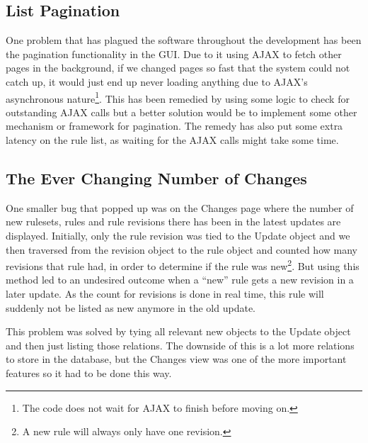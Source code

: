 \subsection{List Pagination}
One problem that has plagued the software throughout the development has been
the pagination functionality in the GUI. Due to it using AJAX to fetch other
pages in the background, if we changed pages so fast that the system could not
catch up, it would just end up never loading anything due to AJAX's asynchronous
nature\footnote{The code does not wait for AJAX to finish before moving on.}.
This has been remedied by using some logic to check for outstanding AJAX calls but a better solution would
be to implement some other mechanism or framework for pagination. The remedy has
also put some extra latency on the rule list, as waiting for the AJAX calls
might take some time.

\subsection{The Ever Changing Number of Changes}
One smaller bug that popped up was on the Changes page where the number of new
rulesets, rules and rule revisions there has been in the latest updates are
displayed. Initially, only the rule revision was tied to the Update object and
we then traversed from the revision object to the rule object and counted how
many revisions that rule had, in order to determine if the rule was new\footnote{A new rule will always only have one revision.}. But using this method led
to an undesired outcome when a ``new'' rule gets a new revision in a later
update. As the count for revisions is done in real time, this rule will suddenly
not be listed as new anymore in the old update.

This problem was solved by tying all relevant new objects to the Update object
and then just listing those relations. The downside of this is a lot
more relations to store in the database, but the Changes view was one of the more
important features so it had to be done this way.
